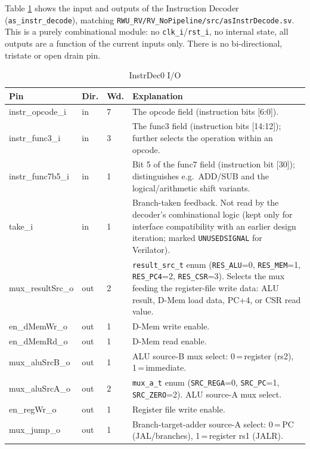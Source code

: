 Table \ref{tab:asDec01} shows the input and outputs of the Instruction
Decoder (\texttt{as\_instr\_decode}), matching
\texttt{RWU\_RV/RV\_NoPipeline/src/asInstrDecode.sv}. This is a purely
combinational module: no \texttt{clk\_i}/\texttt{rst\_i}, no internal
state, all outputs are a function of the current inputs only. There is no
bi-directional, tristate or open drain pin.
\begin{table}[H]
\caption{InstrDec0 I/O}
\label{tab:asDec01}
\centering
\begin{tabularx}{\textwidth}{|l |l |l |X|}
  \hline
  Pin & Dir. & Wd. & Explanation \\
  \hline
  \hline
  instr\_opcode\_i & in & 7 & The opcode field (instruction bits [6:0]). \\
  \hline
  instr\_func3\_i & in & 3 & The func3 field (instruction bits [14:12]); further selects the operation within an opcode. \\
  \hline
  instr\_func7b5\_i & in & 1 & Bit 5 of the func7 field (instruction bit [30]); distinguishes e.g.\ ADD/SUB and the logical/arithmetic shift variants. \\
  \hline
  take\_i & in & 1 & Branch-taken feedback. Not read by the decoder's combinational logic (kept only for interface compatibility with an earlier design iteration; marked \texttt{UNUSEDSIGNAL} for Verilator). \\
  \hline
  mux\_resultSrc\_o & out & 2 & \texttt{result\_src\_t} enum (\texttt{RES\_ALU}=0, \texttt{RES\_MEM}=1, \texttt{RES\_PC4}=2, \texttt{RES\_CSR}=3). Selects the mux feeding the register-file write data: ALU result, D-Mem load data, PC+4, or CSR read value. \\
  \hline
  en\_dMemWr\_o & out & 1 & D-Mem write enable. \\
  \hline
  en\_dMemRd\_o & out & 1 & D-Mem read enable. \\
  \hline
  mux\_aluSrcB\_o & out & 1 & ALU source-B mux select: 0\,=\,register (rs2), 1\,=\,immediate. \\
  \hline
  mux\_aluSrcA\_o & out & 2 & \texttt{mux\_a\_t} enum (\texttt{SRC\_REGA}=0, \texttt{SRC\_PC}=1, \texttt{SRC\_ZERO}=2). ALU source-A mux select. \\
  \hline
  en\_regWr\_o & out & 1 & Register file write enable. \\
  \hline
  mux\_jump\_o & out & 1 & Branch-target-adder source-A select: 0\,=\,PC (JAL/branches), 1\,=\,register rs1 (JALR). \\

\end{tabularx}
\end{table}
